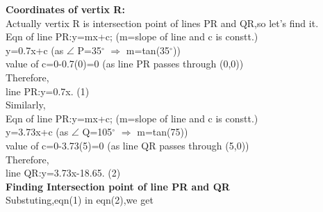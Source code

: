 \documentclass[a4paper,12pt]{article}
\begin{document}
\textbf{Coordinates of vertix R:}\\

Actually vertix R is intersection point of lines PR and QR,so let's find it.\\

Eqn of line PR:y=mx+c;     \hspace*{2cm} (m=slope of line and c is constt.)\\

\hspace*{2.8cm}y=0.7x+c  \hspace*{2cm}  (as  $\angle$ P=35$^{\circ}$ $\Rightarrow$ m=tan(35$^{\circ}$))\\

\hspace*{0.5cm} value of c=0-0.7(0)=0 \hspace*{2cm}(as line PR passes through (0,0))\\

Therefore,\\

\hspace*{0.5cm}line PR:y=0.7x.  \hspace*{3cm}(1) \\

Similarly,\\

Eqn of line PR:y=mx+c;     \hspace*{2cm} (m=slope of line and c is constt.)\\

\hspace*{2.8cm}y=3.73x+c  \hspace*{2cm}  (as  $\angle$ Q=105$^{\circ}$ $\Rightarrow$ m=tan(75))\\

\hspace*{0.5cm} value of c=0-3.73(5)=0 \hspace*{2cm}(as line QR passes through (5,0))\\

Therefore,\\

\hspace*{0.5cm}line QR:y=3.73x-18.65.   \hspace*{2.5cm}(2) \\

\textbf{Finding Intersection point of line PR and QR}\\

Substuting,eqn(1) in eqn(2),we get\\
\end{document}
